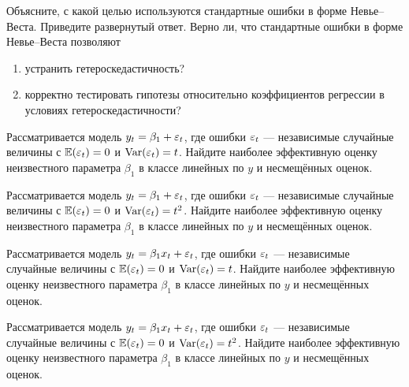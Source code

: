 \begin{problem}
Объясните, с какой целью используются стандартные ошибки в форме Невье–Веста. Приведите развернутый ответ. Верно ли, что стандартные ошибки в форме Невье–Веста позволяют
\begin{enumerate}
\item устранить гетероскедастичность?
\item корректно тестировать гипотезы относительно коэффициентов регрессии в условиях гетероскедастичности?
\end{enumerate}


\begin{sol}
\end{sol}
\end{problem}



\begin{problem}
Рассматривается модель $y_t=\beta_1+\varepsilon_t$, где ошибки $\varepsilon_t$  — независимые
случайные величины с $\mathbb{E}(\varepsilon_t)=0$ и $\operatorname{Var}(\varepsilon_t)=t$. Найдите наиболее эффективную
оценку неизвестного параметра $\beta_1$ в классе линейных по $y$ и несмещённых оценок.

\begin{sol}
\end{sol}
\end{problem}


\begin{problem}
Рассматривается модель $y_t=\beta_1+\varepsilon_t$, где ошибки $\varepsilon_t$  — независимые
случайные величины с $\mathbb{E}(\varepsilon_t)=0$ и $\operatorname{Var}(\varepsilon_t)=t^2$. Найдите наиболее эффективную
оценку неизвестного параметра $\beta_1$ в классе линейных по $y$ и несмещённых оценок.

\begin{sol}
\end{sol}
\end{problem}



\begin{problem}
Рассматривается модель $y_t=\beta_1 x_t+\varepsilon_t$, где ошибки $\varepsilon_t$  — независимые
случайные величины с $\mathbb{E}(\varepsilon_t)=0$ и $\operatorname{Var}(\varepsilon_t)=t$. Найдите наиболее эффективную
оценку неизвестного параметра $\beta_1$ в классе линейных по $y$ и несмещённых оценок.

\begin{sol}
\end{sol}
\end{problem}



\begin{problem}
Рассматривается модель $y_t=\beta_1 x_t +\varepsilon_t$, где ошибки $\varepsilon_t$  — независимые
случайные величины с $\mathbb{E}(\varepsilon_t)=0$ и $\operatorname{Var}(\varepsilon_t)=t^2$. Найдите наиболее эффективную
оценку неизвестного параметра $\beta_1$ в классе линейных по $y$ и несмещённых оценок.

\begin{sol}
\end{sol}
\end{problem}



